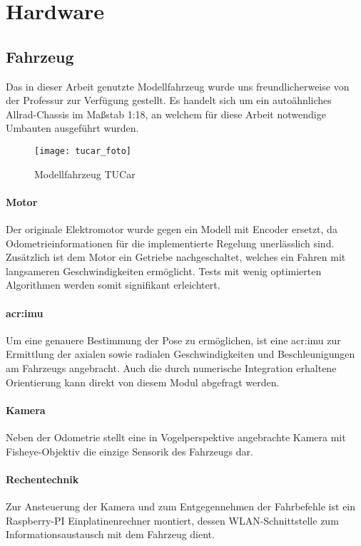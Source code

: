 \section{Hardware}
\subsection{Fahrzeug}
Das in dieser Arbeit genutzte Modellfahrzeug wurde uns freundlicherweise von der Professur zur Verfügung gestellt. Es handelt sich um ein autoähnliches Allrad-Chassis im Maßstab 1:18, an welchem für diese Arbeit notwendige Umbauten ausgeführt wurden.
\begin{figure}[H] %
	\centering
	\texttt{[image: tucar\_foto]}
	\caption{Modellfahrzeug \glqq TUCar \grqq}
	\label{fig:tucar_foto}
\end{figure}
\paragraph{Motor}
Der originale Elektromotor wurde gegen ein Modell mit Encoder ersetzt, da Odometrieinformationen für die implementierte Regelung unerlässlich sind. Zusätzlich ist dem Motor ein Getriebe nachgeschaltet, welches ein Fahren mit langsameren Geschwindigkeiten ermöglicht. Tests mit wenig optimierten Algorithmen werden somit signifikant erleichtert.
\paragraph{\gls{acr:imu}}
Um eine genauere Bestimmung der Pose zu ermöglichen, ist eine \gls{acr:imu} zur Ermittlung der axialen sowie radialen Geschwindigkeiten und Beschleunigungen am Fahrzeugs angebracht. Auch die durch numerische Integration erhaltene Orientierung kann direkt von diesem Modul abgefragt werden. 
\paragraph{Kamera}
Neben der Odometrie stellt eine in Vogelperspektive angebrachte Kamera mit Fisheye-Objektiv die einzige Sensorik des Fahrzeugs dar.
\paragraph{Rechentechnik}
Zur Ansteuerung der Kamera und zum Entgegennehmen der Fahrbefehle ist ein Raspberry-PI Einplatinenrechner montiert, dessen WLAN-Schnittstelle zum Informationsaustausch mit dem Fahrzeug dient.
